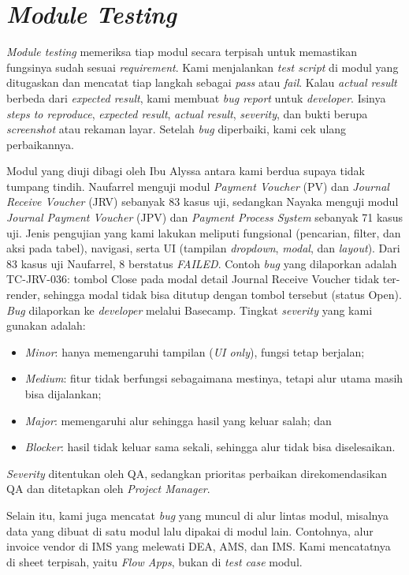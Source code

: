 \section{\textit{Module Testing}}
\textit{Module testing} memeriksa tiap modul secara terpisah untuk memastikan fungsinya sudah sesuai \textit{requirement}. Kami menjalankan \textit{test script} di modul yang ditugaskan dan mencatat tiap langkah sebagai \textit{pass} atau \textit{fail}. Kalau \textit{actual result} berbeda dari \textit{expected result}, kami membuat \textit{bug report} untuk \textit{developer}. Isinya \textit{steps to reproduce}, \textit{expected result}, \textit{actual result}, \textit{severity}, dan bukti berupa \textit{screenshot} atau rekaman layar. Setelah \textit{bug} diperbaiki, kami cek ulang perbaikannya.

Modul yang diuji dibagi oleh Ibu Alyssa antara kami berdua supaya tidak tumpang tindih. Naufarrel menguji modul \textit{Payment Voucher}\label{ist:pv} (PV) dan \textit{Journal Receive Voucher}\label{ist:jrv} (JRV) sebanyak 83 kasus uji, sedangkan Nayaka menguji modul \textit{Journal Payment Voucher}\label{ist:jpv} (JPV) dan \textit{Payment Process System} sebanyak 71 kasus uji. Jenis pengujian yang kami lakukan meliputi fungsional (pencarian, filter, dan aksi pada tabel), navigasi, serta UI (tampilan \textit{dropdown}, \textit{modal}, dan \textit{layout}). Dari 83 kasus uji Naufarrel, 8 berstatus \textit{FAILED}. Contoh \textit{bug} yang dilaporkan adalah TC-JRV-036: tombol Close pada modal detail Journal Receive Voucher tidak ter-render, sehingga modal tidak bisa ditutup dengan tombol tersebut (status Open). \textit{Bug} dilaporkan ke \textit{developer} melalui Basecamp. Tingkat \textit{severity} yang kami gunakan adalah:
\begin{itemize}
\item \textit{Minor}: hanya memengaruhi tampilan (\textit{UI only}), fungsi tetap berjalan;
\item \textit{Medium}: fitur tidak berfungsi sebagaimana mestinya, tetapi alur utama masih bisa dijalankan;
\item \textit{Major}: memengaruhi alur sehingga hasil yang keluar salah; dan
\item \textit{Blocker}: hasil tidak keluar sama sekali, sehingga alur tidak bisa diselesaikan.
\end{itemize}
\textit{Severity} ditentukan oleh QA, sedangkan prioritas perbaikan direkomendasikan QA dan ditetapkan oleh \textit{Project Manager}.

Selain itu, kami juga mencatat \textit{bug} yang muncul di alur lintas modul, misalnya data yang dibuat di satu modul lalu dipakai di modul lain. Contohnya, alur invoice vendor di IMS yang melewati DEA, AMS, dan IMS. Kami mencatatnya di sheet terpisah, yaitu \textit{Flow Apps}, bukan di \textit{test case} modul. 

